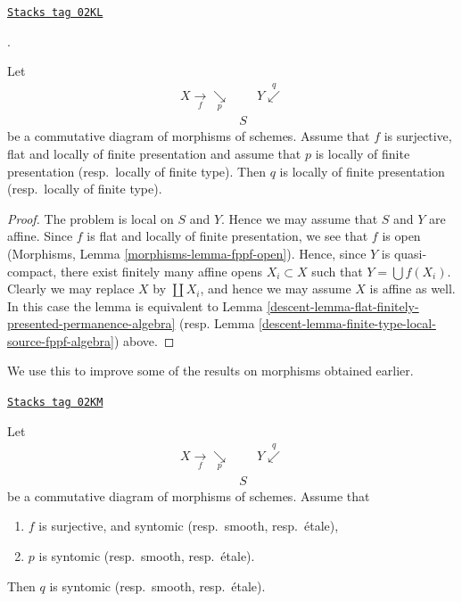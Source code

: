 \begin{lemma}
\label{descent-lemma-flat-finitely-presented-permanence}
\href{https://stacks.math.columbia.edu/tag/02KL}{\texttt{Stacks tag 02KL}}

\begin{reference}
\cite[IV, 17.7.5 (i) and (ii)]{EGA}.
\end{reference}
Let
$$
\begin{array}{ccc}X \underset{f}{\longrightarrow}\underset{p}{\searrow} &  & Y \overset{q}{\swarrow} \\  & S & \end{array}
$$
be a commutative diagram of morphisms of schemes. Assume that $f$ is
surjective, flat and locally of finite presentation and assume
that $p$ is locally of finite presentation (resp.\ locally of finite type).
Then $q$ is locally of finite presentation (resp.\ locally of finite type).
\end{lemma}

\begin{proof}

The problem is local on $S$ and $Y$. Hence we may assume that
$S$ and $Y$ are affine. Since $f$ is flat and locally of finite
presentation, we see that $f$ is open
(Morphisms, Lemma \ref{morphisms-lemma-fppf-open}).
Hence, since $Y$ is quasi-compact, there exist finitely many affine opens
$X_i \subset X$ such that $Y = \bigcup f(X_i)$.
Clearly we may replace $X$ by $\coprod X_i$, and hence we
may assume $X$ is affine as well.
In this case the lemma is equivalent to
Lemma \ref{descent-lemma-flat-finitely-presented-permanence-algebra}
(resp. Lemma \ref{descent-lemma-finite-type-local-source-fppf-algebra})
above.
\end{proof}

We use this to improve some of the results on morphisms
obtained earlier.

\begin{lemma}
\label{descent-lemma-syntomic-smooth-etale-permanence}
\href{https://stacks.math.columbia.edu/tag/02KM}{\texttt{Stacks tag 02KM}}

Let
$$
\begin{array}{ccc}X \underset{f}{\longrightarrow}\underset{p}{\searrow} &  & Y \overset{q}{\swarrow} \\  & S & \end{array}
$$
be a commutative diagram of morphisms of schemes. Assume that
\begin{enumerate}
\item $f$ is surjective, and syntomic (resp.\ smooth, resp.\ \'etale),
\item $p$ is syntomic (resp.\ smooth, resp.\ \'etale).
\end{enumerate}
Then $q$ is syntomic (resp.\ smooth, resp.\ \'etale).
\end{lemma}

